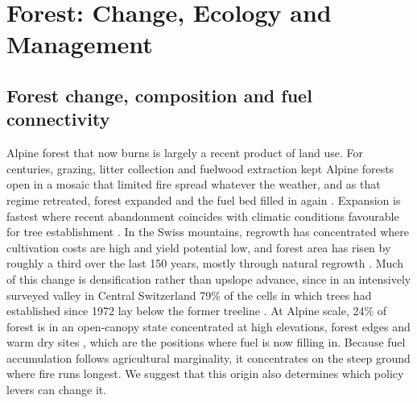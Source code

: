 \documentclass[11pt,a4paper]{article}
\begin{document}
\section{Forest: Change, Ecology and Management}
\label{sec:forest}

\subsection{Forest change, composition and fuel connectivity}

Alpine forest that now burns is largely a recent product of land use. For centuries, grazing, litter collection and fuelwood extraction kept Alpine forests open in a mosaic that limited fire spread whatever the weather, and as that regime retreated, forest expanded and the fuel bed filled in again \citep{bebi_changes_2017, garbarino_contrasting_2020, gellrich_agricultural_2007, frei_evidence_2023, stritih_alternative_2023}. Expansion is fastest where recent abandonment coincides with climatic conditions favourable for tree establishment \citep{garbarino_contrasting_2020}. In the Swiss mountains, regrowth has concentrated where cultivation costs are high and yield potential low, and forest area has risen by roughly a third over the last 150 years, mostly through natural regrowth \citep{gellrich_agricultural_2007}. Much of this change is densification rather than upslope advance, since in an intensively surveyed valley in Central Switzerland 79\% of the cells in which trees had established since 1972 lay below the former treeline \citep{frei_evidence_2023}. At Alpine scale, 24\% of forest is in an open-canopy state concentrated at high elevations, forest edges and warm dry sites \citep{stritih_alternative_2023}, which are the positions where fuel is now filling in. Because fuel accumulation follows agricultural marginality, it concentrates on the steep ground where fire runs longest. We suggest that this origin also determines which policy levers can change it.
\end{document}
